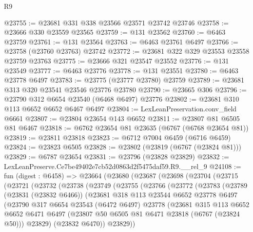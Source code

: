 \begin{lexlean}{R9}
\begin{coremodule}
@23755 := @23681 @331 @338 @23566 @23571 @23742 @23746
@23758 := @23666 @330 @23559 @23565
@23759 := @131 @23562
@23760 := @6463 @23759
@23761 := @131 @23564
@23763 := @6463 @23761 @6497
@23766 := @23758 (@23760 @23763) @23742
@23772 := @23681 @322 @329 @23553 @23558 @23759 @23763
@23775 := @23666 @321 @23547 @23552
@23776 := @131 @23549
@23777 := @6463 @23776
@23778 := @131 @23551
@23780 := @6463 @23778 @6497
@23783 := @23775 (@23777 @23780) @23759
@23789 := @23681 @313 @320 @23541 @23546 @23776 @23780
@23790 := @23665 @306
@23796 := @23790 @312 @6654 @23540 (@6468 @6497) @23776
@23802 := @23681 @310 @113 @6652 @6652 @6467 @6497
@23804 := LexLeanPreservation.conv_field @6661
@23807 := @23804 @23654 @143 @6652
@23811 := @23807 @81 @6505 @81 @6467
@23818 := @6762 @23654 @81 @23635 (@6767 (@6768 @23654 @81))
@23819 := @23811 @23818
@23823 := @6712 @7004 @6459 (@6716 @6459)
@23824 := @23823 @6505
@23828 := @23802 (@23819 (@6767 (@23824 @81)))
@23829 := @6787 @23654
@23831 := @23796 (@23828 @23829)
@23832 := LexLeanPreserve.Ce7be49402e7cb52d0863d2f5475daf59.R9.__rel_9
@24108 := fun (digest : @6458) =>
  @23664
    (@23680
      (@23687
        (@23698
          (@23704
            (@23715
              (@23721
                (@23732
                  (@23738
                    (@23749
                      (@23755
                        (@23766
                          (@23772
                            (@23783
                              (@23789
                                (@23831 (@23832 @6466))
                                (@23681
                                  @318
                                  @113
                                  @23544
                                  @6652
                                  @23778
                                  @6497
                                  (@23790
                                    @317
                                    @6654
                                    @23543
                                    (@6472 @6497)
                                    @23778
                                    (@23681
                                      @315
                                      @113
                                      @6652
                                      @6652
                                      @6471
                                      @6497
                                      (@23807 @50 @6505 @81 @6471 @23818 (@6767 (@23824 @50)))
                                      @23829)
                                    (@23832 @6470))
                                  @23829))

\end{coremodule}
\end{lexlean}
